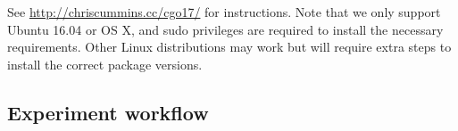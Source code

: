 See \url{http://chriscummins.cc/cgo17/} for instructions. Note that we only support Ubuntu 16.04 or OS X, and sudo privileges are required to install the necessary requirements. Other Linux distributions may work but will require extra steps to install the correct package versions.

%
%
%

\clearpage
\subsection{Experiment workflow}\label{subsec:workflow}

